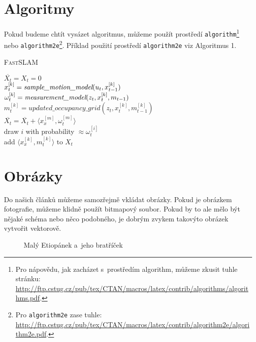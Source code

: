 \documentclass[a4paper,11pt]{article}
\begin{document}
\pagebreak

\section{Algoritmy}
\label{algoritmus}
Pokud budeme chtít vysázet algoritmus, můžeme použít prostředí \verb/algorithm/\footnote{Pro nápovědu, jak zacházet s~prostředím algorithm, můžeme zkusit tuhle stránku:\\ \href{http://ftp.cstug.cz/pub/tex/CTAN/macros/latex/contrib/algorithms/algorithms.pdf}{http://ftp.cstug.cz/pub/tex/CTAN/macros/latex/contrib/algorithms/algorithms.pdf}.} nebo \verb/algorithm2e/\footnote{Pro \texttt{algorithm2e} zase tuhle:
\href{http://ftp.cstug.cz/pub/tex/CTAN/macros/latex/contrib/algorithm2e/algorithm2e.pdf}{http://ftp.cstug.cz/pub/tex/CTAN/macros/latex/contrib/algorithm2e/algorithm2e.pdf}.}.
Příklad použití prostředí \verb/algorithm2e/ viz Algoritmus 1.

\begin{algorithm}[H]
\caption{\textsc{FastSLAM}}
$ \overline{X_t} = X_t = 0 $ \\
{
$ x_t^{[k]} = \emph{sample\_motion\_model}(u_t, x_{t - 1}^{[k]}) $ \\
$ \omega_t^{[k]} = \emph{measurement\_model}(z_t, x_t^{[k]}, m_{t - 1}) $ \\
$ m_t^{[k]} = updated\_occupancy\_grid(z_t, x_t^{[k]}, m_{t - 1}^{[k]}) $ \\
$ \overline{X_t} = \overline{X_t} + \langle x_x^{[m]}, \omega_t^{[m]}  \rangle $ \\
}
{
draw $ i $ with probability $ \approx\omega_t^{[i]} $ \\
add $ \langle x_x^{[k]}, m_t^{[k]} \rangle\textrm{ to } X_t $ \\
}
\end{algorithm}

\section{Obrázky}
Do našich článků můžeme samozřejmě vkládat obrázky. Pokud je obrázkem fotografie,
můžeme klidně použít bitmapový soubor. Pokud by to ale mělo být nějaké schéma nebo
něco podobného, je dobrým zvykem takovýto obrázek vytvořit vektorově.

\begin{figure}[h]
\begin{center}
\caption{Malý Etiopánek a~jeho bratříček}
\label{etiopan}
\end{center}
\end{figure}
\end{document}
